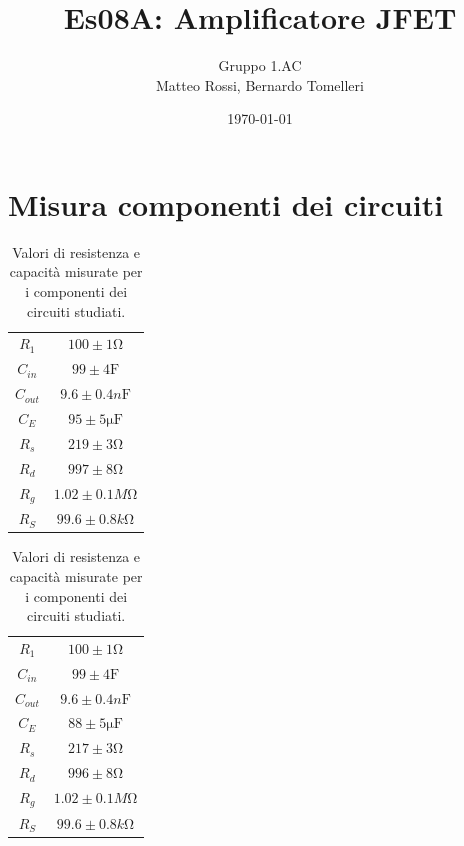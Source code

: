 \documentclass[10pt, a4paper, italian]{article}
\author{Gruppo 1.AC \\ Matteo Rossi, Bernardo Tomelleri}
\title{Es08A: Amplificatore JFET}
\begin{document}
\date{\today}
\maketitle

\setcounter{section}{0}

\section*{Misura componenti dei circuiti}
\begin{table}[htbp]
\centering
\begin{tabular}{cc}
\midrule
$R_1$	  	& $100 \pm 1 \si{\ohm}$\\
$C_{in}$	  	& $99 \pm 4 \si{\F}$	\\
$C_{out}$	& $9.6 \pm 0.4 \si{n\F}$	\\
$C_E$	  	& $95 \pm 5 \si{\micro \F}$\\
$R_s$	  	& $219 \pm 3 \si{\ohm}$	\\
$R_d$	  	& $997 \pm 8 \si{\ohm}$\\
$R_g$	  	& $1.02 \pm 0.1 \si{M\ohm}$\\
$R_S$	  	& $99.6 \pm 0.8 \si{k\ohm}$\\

\bottomrule     
\end{tabular}
\caption{Valori di resistenza e capacità misurate per i componenti dei
circuiti studiati. \label{tab: rcmes_B}}
\end{table}

\begin{table}[H]
\centering
\begin{tabular}{cc}
\midrule
$R_1$	  	& $100 \pm 1 \si{\ohm}$\\
$C_{in}$	  	& $99 \pm 4 \si{\F}$	\\
$C_{out}$	& $9.6 \pm 0.4 \si{n\F}$	\\
$C_E$	  	& $88 \pm 5 \si{\micro \F}$\\
$R_s$	  	& $217 \pm 3 \si{\ohm}$	\\
$R_d$	  	& $996 \pm 8 \si{\ohm}$\\
$R_g$	  	& $1.02 \pm 0.1 \si{M\ohm}$\\
$R_S$	  	& $99.6 \pm 0.8 \si{k\ohm}$\\

\bottomrule     
\end{tabular}
\caption{Valori di resistenza e capacità misurate per i componenti dei
circuiti studiati. \label{tab: rcmes_B}}
\end{table}
\end{document}
